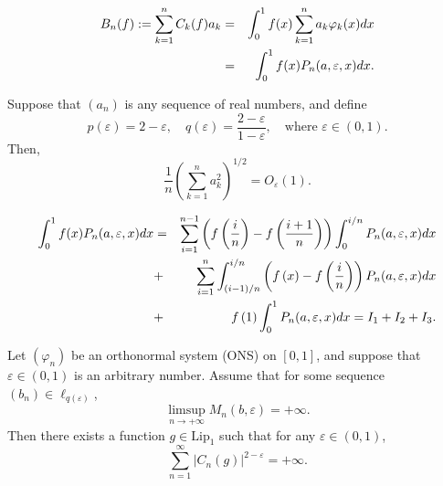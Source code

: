 \documentclass[10pt,a4paper]{amsart}
\begin{document}
	\begin{eqnarray}
		\label{eq7} B_n(f):=\sum_{k=1}^{n} C_k(f) a_k &= &\int_{0}^{1} f(x) \sum_{k=1}^{n} a_k \varphi_{k}(x) dx  \\
		&= & \int_{0}^{1} f(x) P_n (a, \varepsilon, x)dx. \notag 
	\end{eqnarray}

	\begin{lemma} \label{lemma2}
		Suppose that $(a_n)$ is any sequence of real numbers, and define 
		\[
		p(\varepsilon) = 2 - \varepsilon, \quad q(\varepsilon) = \frac{2 - \varepsilon}{1 - \varepsilon}, \quad \text{where } \varepsilon \in (0,1).
		\]
		Then,
		\[
		\frac{1}{n} \left( \sum_{k=1}^{n} a_k^2 \right)^{1/2} = O_\varepsilon(1).
		\]
		
	\end{lemma}

		\begin{eqnarray}
			\label{eq6}
			\int_{0}^{1} f(x) P_n(a, \varepsilon, x) dx &=& \sum_{i=1}^{n-1}\left(f\left(\frac{i}{n}\right)-f\left(\frac{i+1}{n}\right)\right)\int_{0}^{i/n}P_n(a, \varepsilon, x)dx \notag  \\
			&+& \sum_{i=1}^{n}\int_{\left(i-1\right)/n}^{i/n}\left(f\left(x\right) -f\left(\frac{i}{n}\right)\right)P_n(a, \varepsilon, x) dx     \notag \\
			&+& f\left(1\right)\int_{0}^{1}P_n(a, \varepsilon, x)dx=I_1 +I_2  +I_3.   
		\end{eqnarray}

	\begin{theorem}
		\label{theorem2}Let \( (\varphi_n) \) be an orthonormal system (ONS) on \([0,1]\), and suppose that \( \varepsilon \in (0,1) \) is an arbitrary number.  
		Assume that for some sequence \( (b_n) \in \ell_{q(\varepsilon)} \),  
		\begin{equation} \label{eq11}
			\limsup_{n \to +\infty} M_n(b, \varepsilon) = +\infty.
		\end{equation}
		Then there exists a function \( g \in \mathrm{Lip}_1 \) such that for any \( \varepsilon \in (0,1) \),  
		\[
		\sum_{n=1}^\infty |C_n(g)|^{2 - \varepsilon} = +\infty.
		\]	
	\end{theorem}
\end{document}
